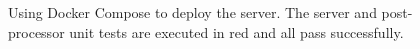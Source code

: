 \begin{figure}[H]
  \centering
  \caption[Server Terminal Output 1]{Using Docker Compose to deploy the server. The server and post-processor unit tests are executed in red and all pass successfully.}
  \label{fig:server-terminal-1}
\end{figure}


